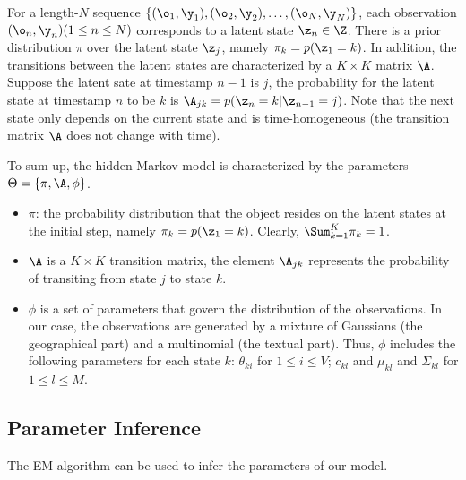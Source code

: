For a length-$N$ sequence $\{(\o_1, \y_1), (\o_2, \y_2),
\ldots, (\o_N, \y_N)\}$, each observation $(\o_n, \y_n) (1 \le n \le N)$ corresponds to a
latent state $\z_n \in \Z$.  There is a prior distribution $\pi$ over the
latent state $\z_j$, namely $\pi_k = p(\z_1 = k)$. In addition, the transitions
between the latent states are characterized by a $K \times K$ matrix $\A$.
Suppose the latent sate at timestamp $n-1$ is $j$, the probability for the
latent state at timestamp $n$ to be $k$ is $\A_{jk} = p(\z_n = k | \z_{n-1} =
j)$. Note that the next state only depends on the current state  and is 
time-homogeneous (the transition matrix $\A$ does not change with time).





To sum up, the hidden Markov model is characterized by the parameters $\Theta = \{\pi, \A, \phi \}$.

\begin{itemize}
  \item
    $\pi$: the probability distribution that the object resides on the latent states
    at the initial step, namely $\pi_k = p(\z_1 = k)$. Clearly, $\Sum_{k=1}^K \pi_k = 1$.
  \item
    $\A$ is a $K \times K$ transition matrix, the element $\A_{jk}$ represents the probability of
    transiting from state $j$ to state $k$.
  \item
    $\phi$ is a set of parameters that govern the distribution of the observations. In our case,
    the observations are generated by a mixture of Gaussians (the geographical part) and a 
    multinomial (the textual part). Thus, $\phi$ includes the following parameters for each state $k$:
    $\theta_{ki}$ for $1 \le i \le V$; $c_{kl}$ and $\mu_{kl}$ and $\Sigma_{kl}$ for $1 \le l \le M$.
\end{itemize}





\subsection{Parameter Inference}
The EM algorithm can be used to infer the parameters of our model.


